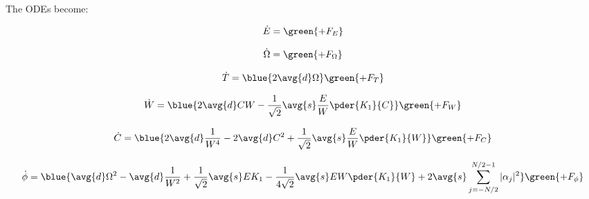 The ODEs become:

\begin{equation}
\begin{split}
\dot{E} &=  \green{+ F_E} \\
\end{split}
\end{equation}

\begin{equation}
\begin{split}
 \dot{\Omega} & =    \green{+ F_\Omega }\\
\end{split}
\end{equation}

\begin{equation}
\begin{split}
 \dot{T} =  \blue{2\avg{d} \Omega}  \green{+ F_T } \\
\end{split}
\end{equation}

\begin{equation}
\begin{split}
 \dot{W} &= \blue{2 \avg{d} C W - \frac{1}{\sqrt{2}} \avg{s} \frac{E}{W} \pder{K_1}{C}} \green{ + F_W }\\ 
\end{split}
\end{equation}

\begin{equation}
\begin{split}
\dot{C} &= \blue{2 \avg{d} \frac{1}{W^4}  - 2 \avg{d} C^2 + \frac{1}{\sqrt{2}}\avg{s} \frac{E}{W} \pder{K_1}{W}} \green{+ F_C } \\
\end{split}
\end{equation}

\begin{equation}
\begin{split}
\dot{\phi} &= \blue{\avg{d} \Omega^2 - \avg{d} \frac{1}{W^2} + \frac{1}{\sqrt{2}} \avg{s} E K_1 - \frac{1}{4\sqrt{2}} \avg{s} EW \pder{K_1}{W} + 2\avg{s}  \sum_{j=-N/2}^{N/2 - 1} |\alpha_j|^2} \green{+F_{\phi}} \\
\end{split}
\end{equation}


